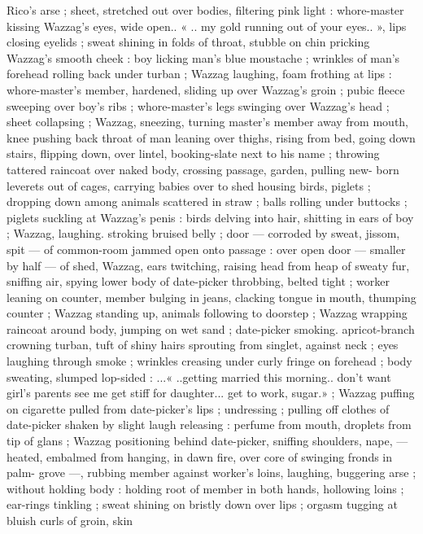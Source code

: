Rico's arse ; sheet, stretched out over bodies, filtering pink light :
whore-master kissing Wazzag's eyes, wide open.. « .. my gold
running out of your eyes.. », lips closing eyelids ; sweat shining in
folds of throat, stubble on chin pricking Wazzag's smooth cheek :
boy licking man's blue moustache ; wrinkles of man's forehead
rolling back under turban ; Wazzag laughing, foam frothing at lips :
whore-master's member, hardened, sliding up over Wazzag’s groin ;
pubic fleece sweeping over boy's ribs ; whore-master's legs swinging
over Wazzag's head ; sheet collapsing ; Wazzag, sneezing, turning
master's member away from mouth, knee pushing back throat of man
leaning over thighs, rising from bed, going down stairs, flipping
down, over lintel, booking-slate next to his name ; throwing tattered
raincoat over naked body, crossing passage, garden, pulling new-
born leverets out of cages, carrying babies over to shed housing
birds, piglets ; dropping down among animals scattered in straw ;
balls rolling under buttocks ; piglets suckling at Wazzag's penis :
birds delving into hair, shitting in ears of boy ; Wazzag, laughing.
stroking bruised belly ; door --- corroded by sweat, jissom, spit ---
of common-room jammed open onto passage : over open door ---
smaller by half --- of shed, Wazzag, ears twitching, raising head from
heap of sweaty fur, sniffing air, spying lower body of date-picker
throbbing, belted tight ; worker leaning on counter, member bulging
in jeans, clacking tongue in mouth, thumping counter ; Wazzag
standing up, animals following to doorstep ; Wazzag wrapping
raincoat around body, jumping on wet sand ; date-picker smoking.
apricot-branch crowning turban, tuft of shiny hairs sprouting from
singlet, against neck ; eyes laughing through smoke ; wrinkles
creasing under curly fringe on forehead ; body sweating, slumped
lop-sided : ...« ..getting married this morning.. don’t want girl's
parents see me get stiff for daughter... get to work, sugar.» ; Wazzag
puffing on cigarette pulled from date-picker's lips ; undressing ;
pulling off clothes of date-picker shaken by slight laugh releasing :
perfume from mouth, droplets from tip of glans ; Wazzag positioning
behind date-picker, sniffing shoulders, nape, --- heated, embalmed
from hanging, in dawn fire, over core of swinging fronds in palm-
grove ---, rubbing member against worker's loins, laughing,
buggering arse ; without holding body : holding root of member in
both hands, hollowing loins ; ear-rings tinkling ; sweat shining on
bristly down over lips ; orgasm tugging at bluish curls of groin, skin
